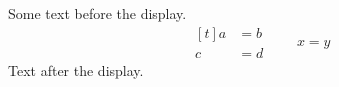 \documentclass[12pt]{article}
\begin{document}
Some text before the display.
\[ \begin{aligned}[t] a &= b \\ c &= d \end{aligned} \qquad x = y \]
Text after the display.
\end{document}

